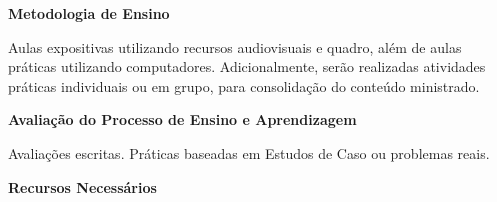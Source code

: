 

 


\begin{snugshade}\begin{center}\textbf{
    Metodologia de Ensino
}\end{center}\end{snugshade} 

\noindent
   Aulas expositivas utilizando recursos audiovisuais e quadro, além de aulas práticas utilizando computadores. Adicionalmente, serão realizadas atividades práticas individuais ou em grupo, para consolidação do conteúdo ministrado.

\begin{snugshade}\begin{center}\textbf{
    Avaliação do Processo de Ensino e Aprendizagem
}\end{center}\end{snugshade}   

\noindent
  Avaliações escritas. Práticas baseadas em Estudos de Caso ou problemas reais.


\begin{snugshade}\begin{center}\textbf{
    Recursos Necessários
    \vphantom{q} %
}\end{center}\end{snugshade}

